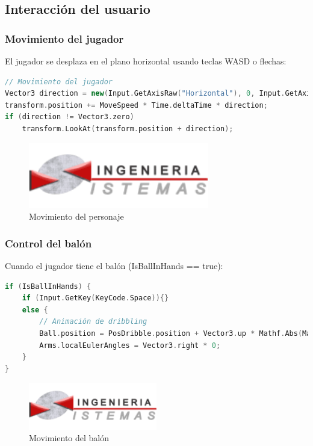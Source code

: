 \subsection{Interacción del usuario}

\subsubsection{Movimiento del jugador}
El jugador se desplaza en el plano horizontal usando teclas WASD o flechas:

\begin{lstlisting}[language=C++]
// Movimiento del jugador
Vector3 direction = new(Input.GetAxisRaw("Horizontal"), 0, Input.GetAxisRaw("Vertical"));
transform.position += MoveSpeed * Time.deltaTime * direction;
if (direction != Vector3.zero)
    transform.LookAt(transform.position + direction);
\end{lstlisting}

\begin{figure}[h]
    \centering
    \includegraphics[width=0.7\textwidth]{img/epis.png}
    \caption{Movimiento del personaje}
    \label{fig:movimiento}
\end{figure}

\subsubsection{Control del balón}
Cuando el jugador tiene el balón (IsBallInHands == true):
\begin{lstlisting}[language=C++]
if (IsBallInHands) {
    if (Input.GetKey(KeyCode.Space)){}
    else {
        // Animación de dribbling
        Ball.position = PosDribble.position + Vector3.up * Mathf.Abs(Mathf.Sin(Time.time * 7));
        Arms.localEulerAngles = Vector3.right * 0;
    }
}
\end{lstlisting}


\begin{figure}[h]
    \centering
    \includegraphics[width=0.5\textwidth]{img/epis.png}
    \caption{Movimiento del balón}
    \label{fig:dribbling}
\end{figure}

